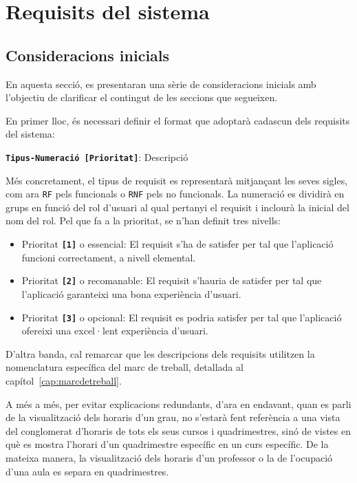 \documentclass[a4paper,12pt]{ThesisStyle}
\begin{document}
\chapter{Requisits del sistema}
\label{cap:requisits}

\section{Consideracions inicials}
\label{sec:consideracions_inicials}

En aquesta secció, es presentaran una sèrie de consideracions inicials amb l'objectiu de clarificar el contingut de les seccions que segueixen.

En primer lloc, és necessari definir el format que adoptarà cadascun dels requisits del sistema:
\\[8pt]
\centerline{\texttt{\textbf{Tipus-Numeració [Prioritat]}}: Descripció}

Més concretament, el tipus de requisit es representarà mitjançant les seves sigles, com ara \texttt{RF} pels funcionals o \texttt{RNF} pels no funcionals. La numeració es dividirà en grups en funció del rol d'usuari al qual pertanyi el requisit i inclourà la inicial del nom del rol. Pel que fa a la prioritat, se n'han definit tres nivells:
\begin{itemize}
  \item Prioritat \texttt{\textbf{[1]}} o essencial: El requisit s'ha de satisfer per tal que l'aplicació funcioni correctament, a nivell elemental.
  \item Prioritat \texttt{\textbf{[2]}} o recomanable: El requisit s'hauria de satisfer per tal que l'aplicació garanteixi una bona experiència d'usuari.
  \item Prioritat \texttt{\textbf{[3]}} o opcional: El requisit es podria satisfer per tal que l'aplicació ofereixi una excel·lent experiència d'usuari.
\end{itemize}

D'altra banda, cal remarcar que les descripcions dels requisits utilitzen la nomenclatura específica del marc de treball, detallada al capítol~\ref{cap:marcdetreball}.

A més a més, per evitar explicacions redundants, d'ara en endavant, quan es parli de la visualització dels horaris d'un grau, no s'estarà fent referència a una vista del conglomerat d'horaris de tots els seus cursos i quadrimestres, sinó de vistes en què es mostra l'horari d'un quadrimestre específic en un curs específic. De la mateixa manera, la visualització dels horaris d'un professor o la de l'ocupació d'una aula es separa en quadrimestres.
\end{document}
